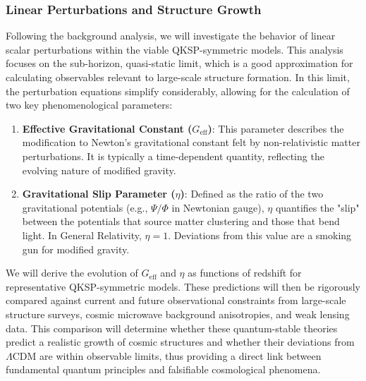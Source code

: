 \documentclass[twocolumn]{aastex631}
\begin{document}
\subsubsection{Linear Perturbations and Structure Growth}
Following the background analysis, we will investigate the behavior of linear scalar perturbations within the viable QKSP-symmetric models. This analysis focuses on the sub-horizon, quasi-static limit, which is a good approximation for calculating observables relevant to large-scale structure formation. In this limit, the perturbation equations simplify considerably, allowing for the calculation of two key phenomenological parameters:
\begin{enumerate}
    \item \textbf{Effective Gravitational Constant ($G_{\text{eff}}$)}: This parameter describes the modification to Newton's gravitational constant felt by non-relativistic matter perturbations. It is typically a time-dependent quantity, reflecting the evolving nature of modified gravity.
    \item \textbf{Gravitational Slip Parameter ($\eta$)}: Defined as the ratio of the two gravitational potentials (e.g., $\Psi/\Phi$ in Newtonian gauge), $\eta$ quantifies the "slip" between the potentials that source matter clustering and those that bend light. In General Relativity, $\eta=1$. Deviations from this value are a smoking gun for modified gravity.
\end{enumerate}
We will derive the evolution of $G_{\text{eff}}$ and $\eta$ as functions of redshift for representative QKSP-symmetric models. These predictions will then be rigorously compared against current and future observational constraints from large-scale structure surveys, cosmic microwave background anisotropies, and weak lensing data. This comparison will determine whether these quantum-stable theories predict a realistic growth of cosmic structures and whether their deviations from $\Lambda$CDM are within observable limits, thus providing a direct link between fundamental quantum principles and falsifiable cosmological phenomena.
\end{document}
